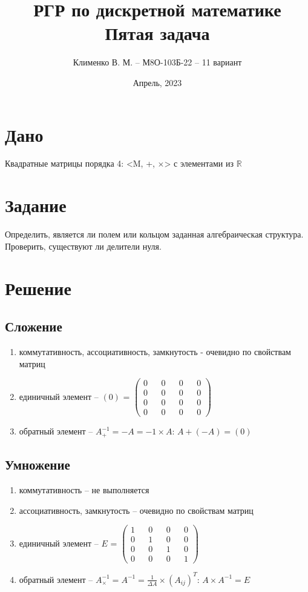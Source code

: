 \documentclass{article}
\title{РГР по дискретной математике\\Пятая задача}
\author{Клименко В. М. -- М8О-103Б-22 -- 11 вариант}
\date{Апрель, 2023}
\begin{document}
\maketitle


\section*{Дано}
Квадратные матрицы порядка 4: <M, +, $\times$> с элементами из $\mathbb{R}$


\section*{Задание}
Определить, является ли полем или кольцом заданная алгебраическая структура.
Проверить, существуют ли делители нуля.

\section*{Решение}
\subsection*{Сложение}
\begin{enumerate}
    \item коммутативность, ассоциативность, замкнутость - очевидно по свойствам матриц
    \item единичный элемент -- $(0)$ =
    $
    \begin{pmatrix}
        0 && 0 && 0 && 0 \\
        0 && 0 && 0 && 0 \\
        0 && 0 && 0 && 0 \\
        0 && 0 && 0 && 0
    \end{pmatrix}
    $
    \item обратный элемент -- $A^{-1}_+ = -A = -1 \times A$: $A + (-A) = (0)$
\end{enumerate}

\subsection*{Умножение}
\begin{enumerate}
    \item коммутативность -- не выполняется
    \item ассоциативность, замкнутость -- очевидно по свойствам матриц
    \item единичный элемент -- $E$ =
    $
    \begin{pmatrix}
        1 && 0 && 0 && 0 \\
        0 && 1 && 0 && 0 \\
        0 && 0 && 1 && 0 \\
        0 && 0 && 0 && 1
    \end{pmatrix}
    $
    \item обратный элемент -- $A^{-1}_{\times} = A^{-1} = \frac{1}{\Delta A}
    \times (A_{ij})^T$: $A \times A^{-1} = E$
\end{enumerate}
\end{document}
